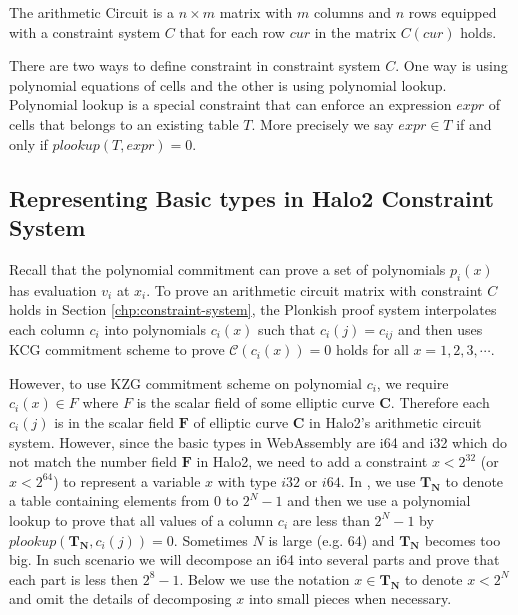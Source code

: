 \begin{definition}
The arithmetic Circuit is a $n \times m$ matrix with $m$ columns and $n$ rows equipped with a constraint system $C$ that for each row $cur$ in the matrix $C(cur)$ holds.
\end{definition}

There are two ways to define constraint in constraint system $C$. One way is using polynomial equations of cells and the other is using polynomial lookup. Polynomial lookup is a special constraint that can enforce an expression $expr$ of cells that belongs to an existing table $T$. More precisely we say $expr \in T$ if and only if $plookup(T, expr) = 0$. 


\subsection{Representing Basic types in Halo2 Constraint System}
Recall that the polynomial commitment can prove a set of polynomials $p_i(x)$ has evaluation $v_i$ at $x_i$. To prove an arithmetic circuit matrix with constraint $C$ holds in Section \ref{chp:constraint-system}, the Plonkish proof system interpolates each column $c_i$ into polynomials $c_i(x)$ such that $c_i(j) = c_{ij}$ and then uses KCG commitment scheme to prove $\mathcal{C}(c_i(x)) = 0$ holds for all $x=1,2,3,\cdots$. 

However, to use KZG commitment scheme on polynomial $c_i$, we require $c_i(x) \in F$ where $F$ is the scalar field of some elliptic curve $\mathbf{C}$. Therefore each $c_i(j)$ is in the scalar field $\mathbf{F}$ of elliptic curve $\mathbf{C}$ in Halo2's arithmetic circuit system. However, since the basic types in WebAssembly are i64 and i32 which do not match the number field $\mathbf{F}$ in Halo2, we need to add a constraint $x<2^{32}$ (or $x< 2^{64}$) to represent a variable $x$ with type $i32$ or $i64$. In \zkwasm, we use $\mathbf{T_N}$ to denote a table containing elements from $0$ to $2^N-1$ and then we use a polynomial lookup to prove that all values of a column $c_i$ are less than $2^N-1$ by $plookup(\mathbf{T_N}, c_i(j)) = 0$. Sometimes $N$ is large (e.g. 64) and $\mathbf{T_N}$ becomes too big. In such scenario we will decompose an i64 into several parts and prove that each part is less then $2^8-1$. Below we use the notation $x \in \mathbf{T_N}$ to denote $x < 2^N$ and omit the details of decomposing $x$ into small pieces when necessary.

